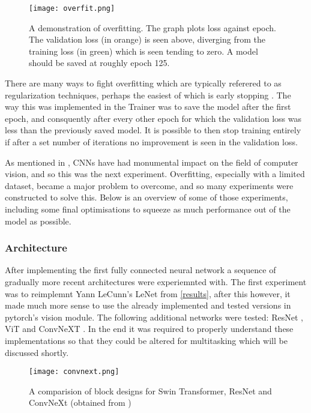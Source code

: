 \begin{figure}[h]
    \centering
    \texttt{[image: overfit.png]}
    \caption{A demonstration of overfitting.  The graph plots loss against epoch. The validation loss (in orange) is seen above, diverging from the training loss (in green) which is seen tending
    to zero.
    A model should be saved at roughly epoch 125.}
    \label{fig:overfit}
\end{figure}

There are many ways to fight overfitting which are typically referered to as regularization techniques, perhaps the easiest of which is early stopping \cite{yao2007early}.
The way this was implemented in the Trainer was to save the model after the first epoch, and consquently after every other epoch for which the validation 
loss was less than the previously saved model.  It is possible to then stop training entirely if after a set number of iterations no improvement is seen 
in the validation loss.

As mentioned in , CNNs have had monumental 
impact on the field of computer vision, and so this was the next experiment.  Overfitting, especially with a limited dataset,
became a major problem to overcome, and so many experiments were constructed to solve this.  Below is an overview of some of those 
experiments, including some final optimisations to squeeze as much performance out of the model as possible.


\subsubsection{Architecture}
After implementing the first fully connected neural network a sequence of gradually more recent architectures were experiemnted with.
The first experiment was to reimplemnt Yann LeCunn's LeNet from \ref{results}, after this however, it made much more sense to use the already implemented 
and tested versions in pytorch's vision module.  The following additional networks were tested: ResNet \cite{he2016deep}, ViT \cite{ViT} and ConvNeXT \cite{liu2022convnet}.  
In the end it was required to properly understand these implementations so that they could be altered for multitasking which will be discussed shortly.

\begin{figure}[h]
    \centering
    \texttt{[image: convnext.png]}
    \caption{A comparision of block designs for Swin Transformer, ResNet and ConvNeXt (obtained from \cite{liu2022convnet})}
    \label{fig:convnext}
\end{figure}

